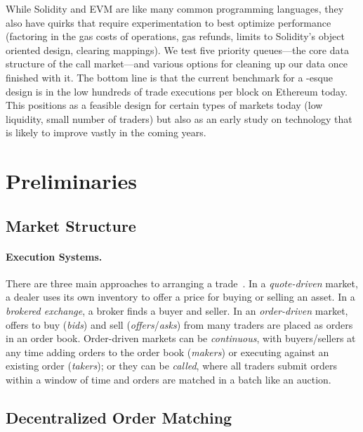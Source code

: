 While Solidity and EVM are like many common programming languages, they also have quirks that require experimentation to best optimize performance (\eg factoring in the gas costs of operations, gas refunds, limits to Solidity's object oriented design, clearing mappings). We test five priority queues---the core data structure of the call market---and various options for cleaning up our data once finished with it. The bottom line is that the current benchmark for a \cm-esque design is in the low hundreds of trade executions per block on Ethereum today. This positions \cm as a feasible design for certain types of markets today (low liquidity, small number of traders) but also as an early study on technology that is likely to improve vastly in the coming years. 


\section{Preliminaries}

\subsection{Market Structure}

\paragraph{Execution Systems.} There are three main approaches to arranging a trade~\cite{Har03}. In a \emph{quote-driven} market, a dealer uses its own inventory to offer a price for buying or selling an asset. In a \emph{brokered exchange}, a broker finds a buyer and seller. In an \emph{order-driven} market, offers to buy (\emph{bids}) and sell (\emph{offers}/\emph{asks}) from many traders are placed as orders in an order book. Order-driven markets can be \emph{continuous}, with buyers/sellers at any time adding orders to the order book (\emph{makers}) or executing against an existing order (\emph{takers}); or they can be \emph{called}, where all traders submit orders within a window of time and orders are matched in a batch like an auction. 

\subsection{Decentralized Order Matching}

